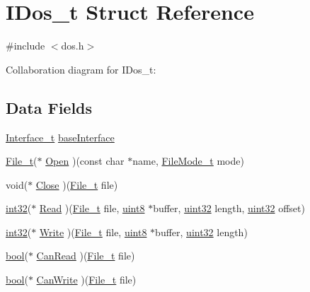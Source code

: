 \hypertarget{structIDos__t}{\section{I\+Dos\+\_\+t Struct Reference}
\label{structIDos__t}
}


{\ttfamily \#include $<$dos.\+h$>$}



Collaboration diagram for I\+Dos\+\_\+t\+:
\subsection*{Data Fields}
\begin{DoxyCompactItemize}
\item 
\hyperlink{structInterface__t}{Interface\+\_\+t} \hyperlink{structIDos__t_a9e8c9816d54bd63fef086cb1de661ed8}{base\+Interface}
\item 
\hyperlink{dos_8h_a4b6c6dd7aeae2215bbd688cb79fc1ba9}{File\+\_\+t}($\ast$ \hyperlink{structIDos__t_a3c8c9ae4c3789276390aa10a30f7ea8a}{Open} )(const char $\ast$name, \hyperlink{dos_8h_a3cdef560aca943423a91c6bd3bec421b}{File\+Mode\+\_\+t} mode)
\item 
void($\ast$ \hyperlink{structIDos__t_a5a60d031db8a3720299ec5c886d941f3}{Close} )(\hyperlink{dos_8h_a4b6c6dd7aeae2215bbd688cb79fc1ba9}{File\+\_\+t} file)
\item 
\hyperlink{type_8h_ab7903878916593daecbeb95b98115ab0}{int32}($\ast$ \hyperlink{structIDos__t_afde908870eb926935b5288a04307626c}{Read} )(\hyperlink{dos_8h_a4b6c6dd7aeae2215bbd688cb79fc1ba9}{File\+\_\+t} file, \hyperlink{type_8h_a33a5e996e7a90acefb8b1c0bea47e365}{uint8} $\ast$buffer, \hyperlink{type_8h_acbd4acd0d29e2d6c43104827f77d9cd2}{uint32} length, \hyperlink{type_8h_acbd4acd0d29e2d6c43104827f77d9cd2}{uint32} offset)
\item 
\hyperlink{type_8h_ab7903878916593daecbeb95b98115ab0}{int32}($\ast$ \hyperlink{structIDos__t_ac6fcad20ab581ddb3abbca96f681d8fe}{Write} )(\hyperlink{dos_8h_a4b6c6dd7aeae2215bbd688cb79fc1ba9}{File\+\_\+t} file, \hyperlink{type_8h_a33a5e996e7a90acefb8b1c0bea47e365}{uint8} $\ast$buffer, \hyperlink{type_8h_acbd4acd0d29e2d6c43104827f77d9cd2}{uint32} length)
\item 
\hyperlink{type_8h_af6a258d8f3ee5206d682d799316314b1}{bool}($\ast$ \hyperlink{structIDos__t_a7767fc9d37747e3baf93d7f1ee575293}{Can\+Read} )(\hyperlink{dos_8h_a4b6c6dd7aeae2215bbd688cb79fc1ba9}{File\+\_\+t} file)
\item 
\hyperlink{type_8h_af6a258d8f3ee5206d682d799316314b1}{bool}($\ast$ \hyperlink{structIDos__t_a4ceda128c5e1514f483184c1f0b4a2d4}{Can\+Write} )(\hyperlink{dos_8h_a4b6c6dd7aeae2215bbd688cb79fc1ba9}{File\+\_\+t} file)

\end{DoxyCompactItemize}
